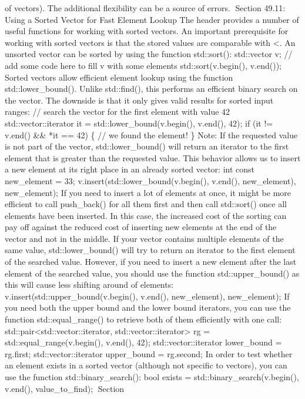 of vectors). The additional ﬂexibility can be a source of errors.
Section 49.11: Using a Sorted Vector for Fast Element Lookup The header
provides a number of useful functions for working with sorted vectors.
An important prerequisite for working with sorted vectors is that the
stored values are comparable with \textless. An unsorted vector can be
sorted by using the function std::sort(): std::vector v; // add some
code here to fill v with some elements std::sort(v.begin(), v.end());
Sorted vectors allow eﬃcient element lookup using the function
std::lower\_bound(). Unlike std::find(), this performs an eﬃcient binary
search on the vector. The downside is that it only gives valid results
for sorted input ranges: // search the vector for the first element with
value 42 std::vector::iterator it = std::lower\_bound(v.begin(),
v.end(), 42); if (it != v.end() \&\& *it == 42) \{ // we found the
element! \} Note: If the requested value is not part of the vector,
std::lower\_bound() will return an iterator to the ﬁrst element that is
greater than the requested value. This behavior allows us to insert a
new element at its right place in an already sorted vector: int const
new\_element = 33; v.insert(std::lower\_bound(v.begin(), v.end(),
new\_element), new\_element); If you need to insert a lot of elements at
once, it might be more eﬃcient to call push\_back() for all them ﬁrst
and then call std::sort() once all elements have been inserted. In this
case, the increased cost of the sorting can pay oﬀ against the reduced
cost of inserting new elements at the end of the vector and not in the
middle. If your vector contains multiple elements of the same value,
std::lower\_bound() will try to return an iterator to the ﬁrst element
of the searched value. However, if you need to insert a new element
after the last element of the searched value, you should use the
function std::upper\_bound() as this will cause less shifting around of
elements: v.insert(std::upper\_bound(v.begin(), v.end(), new\_element),
new\_element); If you need both the upper bound and the lower bound
iterators, you can use the function std::equal\_range() to retrieve both
of them eﬃciently with one call:
std::pair\textless std::vector::iterator,
std::vector::iterator\textgreater{} rg = std::equal\_range(v.begin(),
v.end(), 42); std::vector::iterator lower\_bound = rg.first;
std::vector::iterator upper\_bound = rg.second; In order to test whether
an element exists in a sorted vector (although not speciﬁc to vectors),
you can use the function std::binary\_search(): bool exists =
std::binary\_search(v.begin(), v.end(), value\_to\_find); Section
